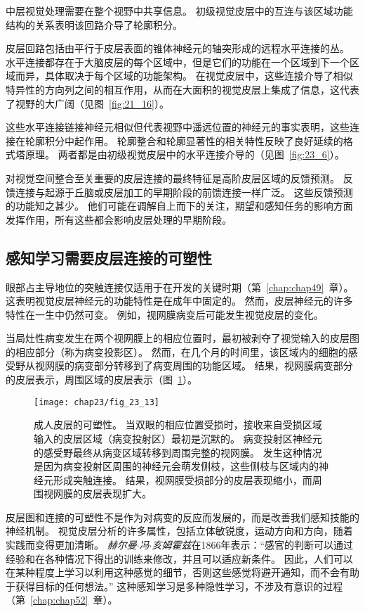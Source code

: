 中层视觉处理需要在整个视野中共享信息。
初级视觉皮层中的互连与该区域功能结构的关系表明该回路介导了轮廓积分。


皮层回路包括由平行于皮层表面的锥体神经元的轴突形成的远程水平连接的丛。
水平连接都存在于大脑皮层的每个区域中，但是它们的功能在一个区域到下一个区域而异，具体取决于每个区域的功能架构。
在视觉皮层中，这些连接介导了相似特异性的方向列之间的相互作用，从而在大面积的视觉皮层上集成了信息，这代表了视野的大广阔（见图~\ref{fig:21_16}）。


这些水平连接链接神经元相似但代表视野中遥远位置的神经元的事实表明，这些连接在轮廓积分中起作用。
轮廓整合和轮廓显著性的相关特性反映了良好延续的格式塔原理。
两者都是由初级视觉皮层中的水平连接介导的（见图~\ref{fig:23_6}）。


对视觉空间整合至关重要的皮层连接的最终特征是高阶皮层区域的反馈预测。
反馈连接与起源于丘脑或皮层加工的早期阶段的前馈连接一样广泛。
这些反馈预测的功能知之甚少。
他们可能在调解自上而下的关注，期望和感知任务的影响方面发挥作用，所有这些都会影响皮层处理的早期阶段。



\subsection{感知学习需要皮层连接的可塑性}

眼部占主导地位的突触连接仅适用于在开发的关键时期（第~\ref{chap:chap49}~章）。
这表明视觉皮层神经元的功能特性是在成年中固定的。
然而，皮层神经元的许多特性在一生中仍然可变。
例如，视网膜病变后可能发生视觉皮层的变化。


当局灶性病变发生在两个视网膜上的相应位置时，最初被剥夺了视觉输入的皮层图的相应部分（称为病变投影区）。
然而，在几个月的时间里，该区域内的细胞的感受野从视网膜的病变部分转移到了病变周围的功能区域。
结果，视网膜病变部分的皮层表示，周围区域的皮层表示（图~\ref{fig:23_13}）。


\begin{figure}[htbp]
	\centering
	\texttt{[image: chap23/fig\_23\_13]}
	\caption{成人皮层的可塑性。
		当双眼的相应位置受损时，接收来自受损区域输入的皮层区域（病变投射区）最初是沉默的。
		病变投射区神经元的感受野最终从病变区域转移到周围完整的视网膜。
		发生这种情况是因为病变投射区周围的神经元会萌发侧枝，这些侧枝与区域内的神经元形成突触连接。
		结果，视网膜受损部分的皮层表现缩小，而周围视网膜的皮层表现扩大。}
	\label{fig:23_13}
\end{figure}


皮层图和连接的可塑性不是作为对病变的反应而发展的，而是改善我们感知技能的神经机制。
视觉皮层分析的许多属性，包括立体敏锐度，运动方向和方向，随着实践而变得更加清晰。
\textit{赫尔曼$\cdot$冯$\cdot$亥姆霍兹}在1866年表示：“感官的判断可以通过经验和在各种情况下得出的训练来修改，并且可以适应新条件。
因此，人们可以在某种程度上学习以利用这种感觉的细节，否则这些感觉将避开通知，而不会有助于获得目标的任何想法。” 
这种感知学习是多种隐性学习，不涉及有意识的过程（第~\ref{chap:chap52}~章）。


